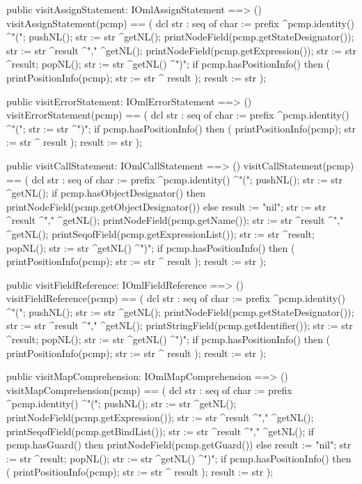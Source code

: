 \begin{vdm_al}
  public visitAssignStatement: IOmlAssignStatement ==> ()
  visitAssignStatement(pcmp) ==
    ( dcl str : seq of char := prefix ^pcmp.identity() ^"(";
      pushNL();
      str := str ^getNL();
      printNodeField(pcmp.getStateDesignator());
      str := str ^result ^"," ^getNL();
      printNodeField(pcmp.getExpression());
      str := str ^result;
      popNL();
      str := str ^getNL() ^")";
      if pcmp.hasPositionInfo()
      then ( printPositionInfo(pcmp);
             str := str ^ result );
      result := str );

  public visitErrorStatement: IOmlErrorStatement ==> ()
  visitErrorStatement(pcmp) ==
    ( dcl str : seq of char := prefix ^pcmp.identity() ^"(";
      str := str ^")";
      if pcmp.hasPositionInfo()
      then ( printPositionInfo(pcmp);
             str := str ^ result );
      result := str );

  public visitCallStatement: IOmlCallStatement ==> ()
  visitCallStatement(pcmp) ==
    ( dcl str : seq of char := prefix ^pcmp.identity() ^"(";
      pushNL();
      str := str ^getNL();
      if pcmp.hasObjectDesignator()
      then printNodeField(pcmp.getObjectDesignator())
      else result := "nil";
      str := str ^result ^"," ^getNL();
      printNodeField(pcmp.getName());
      str := str ^result ^"," ^getNL();
      printSeqofField(pcmp.getExpressionList());
      str := str ^result;
      popNL();
      str := str ^getNL() ^")";
      if pcmp.hasPositionInfo()
      then ( printPositionInfo(pcmp);
             str := str ^ result );
      result := str );

  public visitFieldReference: IOmlFieldReference ==> ()
  visitFieldReference(pcmp) ==
    ( dcl str : seq of char := prefix ^pcmp.identity() ^"(";
      pushNL();
      str := str ^getNL();
      printNodeField(pcmp.getStateDesignator());
      str := str ^result ^"," ^getNL();
      printStringField(pcmp.getIdentifier());
      str := str ^result;
      popNL();
      str := str ^getNL() ^")";
      if pcmp.hasPositionInfo()
      then ( printPositionInfo(pcmp);
             str := str ^ result );
      result := str );

  public visitMapComprehension: IOmlMapComprehension ==> ()
  visitMapComprehension(pcmp) ==
    ( dcl str : seq of char := prefix ^pcmp.identity() ^"(";
      pushNL();
      str := str ^getNL();
      printNodeField(pcmp.getExpression());
      str := str ^result ^"," ^getNL();
      printSeqofField(pcmp.getBindList());
      str := str ^result ^"," ^getNL();
      if pcmp.hasGuard()
      then printNodeField(pcmp.getGuard())
      else result := "nil";
      str := str ^result;
      popNL();
      str := str ^getNL() ^")";
      if pcmp.hasPositionInfo()
      then ( printPositionInfo(pcmp);
             str := str ^ result );
      result := str );


\end{vdm_al}
